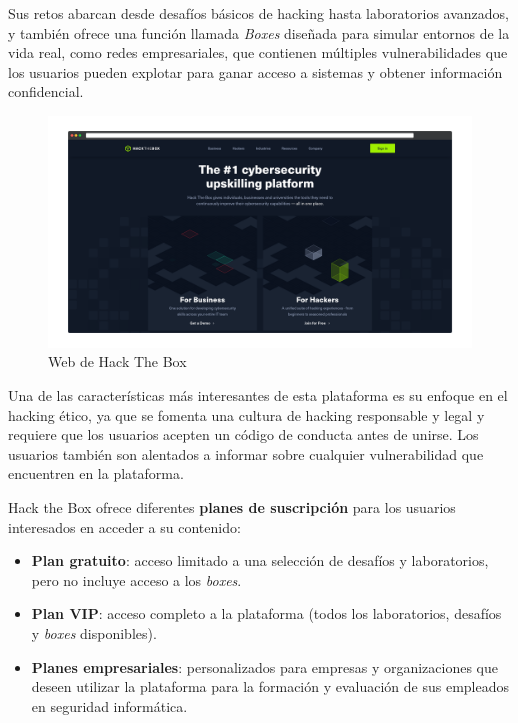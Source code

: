         Sus retos abarcan desde desafíos básicos de hacking hasta laboratorios avanzados, y también ofrece una función llamada \textit{Boxes} diseñada para simular entornos de la vida real, como redes empresariales, que contienen múltiples vulnerabilidades que los usuarios pueden explotar para ganar acceso a sistemas y obtener información confidencial.
        
        \begin{figure}[h]
            \centering
            \includegraphics[width=\textwidth]{images/Capturas/Web de HTB.png}
            \caption{Web de Hack The Box}
            \label{fig:HTB-web}
        \end{figure}
        
        Una de las características más interesantes de esta plataforma es su enfoque en el hacking ético, ya que se fomenta una cultura de hacking responsable y legal y requiere que los usuarios acepten un código de conducta antes de unirse. Los usuarios también son alentados a informar sobre cualquier vulnerabilidad que encuentren en la plataforma.
        
        Hack the Box ofrece diferentes \textbf{planes de suscripción} para los usuarios interesados en acceder a su contenido:
        
        \begin{itemize}
            \item \textbf{Plan gratuito}: acceso limitado a una selección de desafíos y laboratorios, pero no incluye acceso a los \textit{boxes}.
        
            \item \textbf{Plan VIP}: acceso completo a la plataforma (todos los laboratorios, desafíos y \textit{boxes} disponibles).
        
            \item \textbf{Planes empresariales}: personalizados para empresas y organizaciones que deseen utilizar la plataforma para la formación y evaluación de sus empleados en seguridad informática.
        \end{itemize}
        
